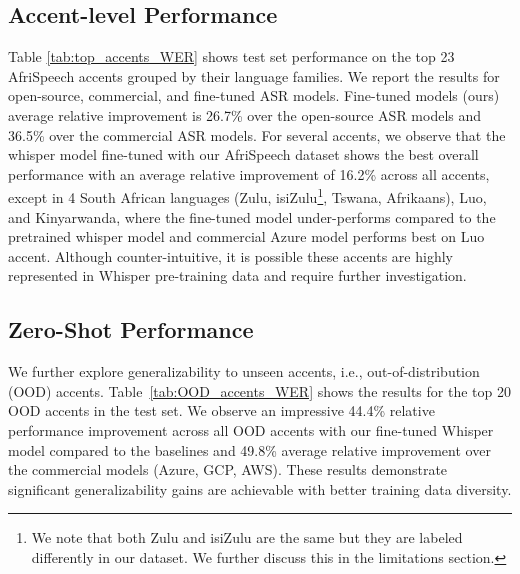 \documentclass[11pt,a4paper]{article}
\begin{document}
\subsection{Accent-level Performance} 
\label{accent_level_performance}
Table \ref{tab:top_accents_WER} shows test set performance on the top 23 AfriSpeech accents grouped by their language families. We report the results for open-source, commercial, and fine-tuned ASR models. Fine-tuned models (ours) average relative improvement is 26.7\% over the open-source ASR models and 36.5\% over the commercial ASR models. For several accents, we observe that the whisper model fine-tuned with our AfriSpeech dataset shows the best overall performance with an average relative improvement of 16.2\% across all accents, except in 4 South African languages (Zulu, isiZulu\footnote{We note that both Zulu and isiZulu are the same but they are labeled differently in our dataset. We further discuss this in the limitations section.}, Tswana, Afrikaans), Luo, and Kinyarwanda, where the fine-tuned model under-performs compared to the pretrained whisper model and commercial Azure model performs best on Luo accent. Although counter-intuitive, it is possible these accents are highly represented in Whisper pre-training data and require further investigation. %


\subsection{Zero-Shot Performance}
We further explore generalizability to unseen accents, i.e., out-of-distribution (OOD) accents. Table~\ref{tab:OOD_accents_WER} shows the results for the top 20 OOD accents in the test set. We observe an impressive 44.4\% relative performance improvement across all OOD accents with our fine-tuned Whisper model compared to the baselines and 49.8\% average relative improvement over the commercial models (Azure, GCP, AWS). These results demonstrate significant generalizability gains are achievable with better training data diversity.
\end{document}

